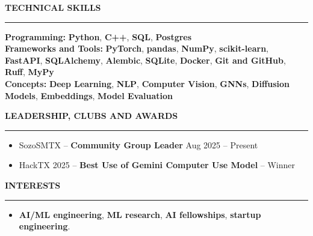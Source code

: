 \documentclass[10pt, letterpaper]{article}
\newenvironment{highlights}{
    \begin{itemize}[
        topsep=0.10 cm,
        parsep=0.10 cm,
        partopsep=0pt,
        itemsep=0pt,
        leftmargin=0 cm + 10pt
    ]
}{
    \end{itemize}
} %
\begin{document}
    {\bfseries TECHNICAL SKILLS} \\
    \vspace{2pt}
    \hrule
    \vspace{2pt}
    \textbf{Programming:} \textbf{Python}, \textbf{C++}, \textbf{SQL}, \textbf{Postgres} \\
    \textbf{Frameworks and Tools:} \textbf{PyTorch}, \textbf{pandas}, \textbf{NumPy}, \textbf{scikit-learn}, \textbf{FastAPI}, \textbf{SQLAlchemy}, \textbf{Alembic}, \textbf{SQLite}, \textbf{Docker}, \textbf{Git and GitHub}, \textbf{Ruff}, \textbf{MyPy} \\
    \textbf{Concepts:} \textbf{Deep Learning}, \textbf{NLP}, \textbf{Computer Vision}, \textbf{GNNs}, \textbf{Diffusion Models}, \textbf{Embeddings}, \textbf{Model Evaluation}
    \vspace{6pt}

    {\bfseries LEADERSHIP, CLUBS AND AWARDS} \\
    \vspace{2pt}
    \hrule
    \vspace{2pt}
    \begin{highlights}
        \item SozoSMTX -- \textbf{Community Group Leader} \hfill Aug 2025 -- Present
        \item HackTX 2025 -- \textbf{Best Use of Gemini Computer Use Model} -- Winner
    \end{highlights}

    {\bfseries INTERESTS} \\
    \vspace{2pt}
    \hrule
    \vspace{2pt}
    \begin{highlights}
        \item \textbf{AI/ML engineering}, \textbf{ML research}, \textbf{AI fellowships}, \textbf{startup engineering}.
    \end{highlights}
\end{document}
